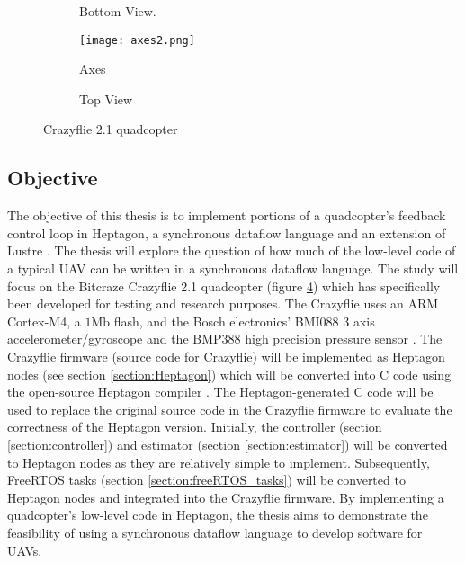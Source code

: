 \documentclass[10pt, a4paper]{article}
\begin{document}
    \begin{figure}[hbt!]
        \centering
        \begin{subfigure}[b]{0.28\linewidth}
            \caption{Bottom View.}
            \label{figure:bottom}
        \end{subfigure}
        \hfill
        \begin{subfigure}[b]{0.35\textwidth}
            \centering
            \texttt{[image: axes2.png]}
            \caption{Axes}
            \label{figure:axes}
        \end{subfigure}
        \hfill
        \begin{subfigure}[b]{0.31\textwidth}
            \caption{Top View}
            \label{figure:axes}
        \end{subfigure}
        \caption{Crazyflie 2.1 quadcopter}
        \label{figure:Crazyflie}
    \end{figure}  

    \subsection{Objective}
    The objective of this thesis is to implement portions of a quadcopter's feedback control loop in Heptagon, a synchronous dataflow language and an extension of Lustre \cite{article:lustre-paper}. The thesis will explore the question of how much of the low-level code of a typical UAV can be written in a synchronous dataflow language. The study will focus on the Bitcraze Crazyflie 2.1 quadcopter (figure \ref{figure:Crazyflie}) which has specifically been developed for testing and research purposes. The Crazyflie uses an ARM Cortex-M4, a $1$Mb flash, and the Bosch electronics' BMI$088$ 3 axis accelerometer/gyroscope and the BMP$388$ high precision pressure sensor \cite{web:crazyflie-2.1}. The Crazyflie firmware (source code for Crazyflie) will be implemented as Heptagon nodes (see section \ref{section:Heptagon}) which will be converted into C code using the open-source Heptagon compiler \cite{software:heptagon-compiler}. The Heptagon-generated C code will be used to replace the original source code in the Crazyflie firmware to evaluate the correctness of the Heptagon version. Initially, the controller (section \ref{section:controller}) and estimator (section \ref{section:estimator}) will be converted to Heptagon nodes as they are relatively simple to implement. Subsequently, FreeRTOS tasks (section \ref{section:freeRTOS_tasks}) will be converted to Heptagon nodes and integrated into the Crazyflie firmware. By implementing a quadcopter's low-level code in Heptagon, the thesis aims to demonstrate the feasibility of using a synchronous dataflow language to develop software for UAVs.
\end{document}
